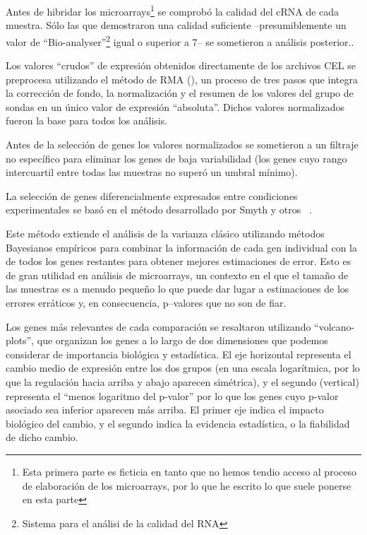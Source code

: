 \documentclass[a4paper]{article}\usepackage[]{graphicx}\usepackage[]{color}
\begin{document}
Antes de hibridar los microarrays\footnote{Esta primera parte es ficticia en tanto que no hemos tendio acceso al proceso de elaboración de los microarrays, por lo que he escrito lo que suele ponerse en esta parte} se comprobó la calidad del cRNA de cada muestra. Sólo las que demostraron una calidad suficiente --presumiblemente un valor de ``Bio-analyser''\footnote{Sistema para el análisi de la calidad del RNA} igual o superior a 7-- se sometieron a análisis posterior.. 

Los valores ``crudos'' de expresión obtenidos directamente de los archivos CEL se preprocesa utilizando el método de RMA (\cite{Irizarry:2003}), un proceso de tres pasos que integra la corrección de fondo, la normalización y el resumen de los valores del grupo de sondas en un único valor de expresión ``absoluta''. Dichos valores normalizados fueron la base para todos los análisis.

Antes de la selección de genes los valores normalizados se sometieron a un filtraje no específico para eliminar los genes de baja 
variabilidad (los genes cuyo rango intercuartil entre todas las muestras no superó un umbral mínimo).

La selección de genes diferencialmente expresados entre condiciones experimentales se basó en el método desarrollado por Smyth y otros ~\cite{Smyth:2004}.


Este método extiende el análisis de la varianza clásico utilizando métodos Bayesianos empíricos para combinar la información de cada gen individual con la de todos los genes restantes para obtener mejores estimaciones de error. Esto es de gran utilidad en análisis de microarrays, un contexto en el que el tamaño de las muestras es a menudo pequeño lo que puede dar lugar a estimaciones de los errores erráticos y, en consecuencia, p--valores que no son de fiar.

Los genes más relevantes de cada comparaci\'on se resaltaron utilizando ``volcano-plots'', 
que organizan los genes a lo largo de dos dimensiones que podemos considerar de importancia biológica y estadística. El eje horizontal representa el cambio medio de expresión entre los dos grupos (en una escala logarítmica, por lo que la regulación hacia arriba y abajo aparecen simétrica), y el segundo (vertical) representa el ``menos logaritmo del p-valor'' por lo que los genes cuyo p-valor asociado sea inferior aparecen más arriba. El primer eje indica el impacto biológico del cambio, y el segundo indica la evidencia estadística, o la fiabilidad de dicho cambio.
\end{document}
